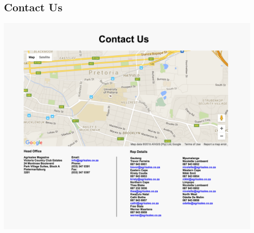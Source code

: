 \documentclass[11pt]{article}
\begin{document}
	\subsection{Contact Us}
		\includegraphics[width=\textwidth]{../Images/Pages/ContactUs}

\newpage
\end{document}
